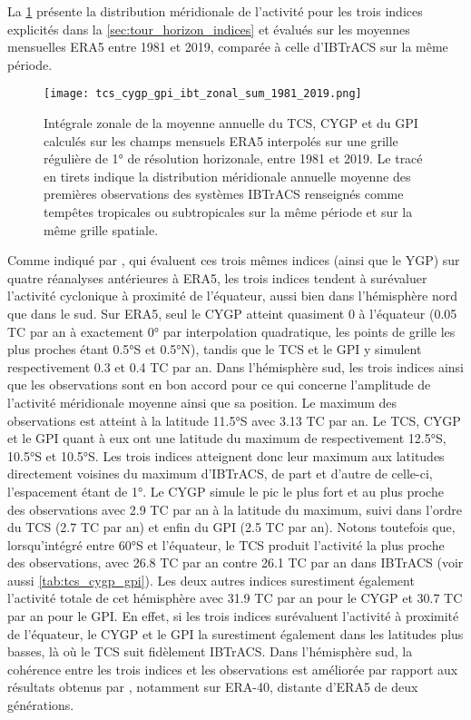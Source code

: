 \documentclass[../main.tex]{subfiles}
\begin{document}
La \cref{fig:tcs_cygp_gpi_zonal} présente la distribution méridionale de l'activité pour les trois indices explicités dans la \cref{sec:tour_horizon_indices} et
évalués sur les moyennes mensuelles ERA5 entre \num{1981} et \num{2019}, comparée à celle d'IBTrACS sur la même période. 
%
\begin{figure}[htb]
    \centering
    \texttt{[image: tcs\_cygp\_gpi\_ibt\_zonal\_sum\_1981\_2019.png]}
    \caption{Intégrale zonale de la moyenne annuelle du TCS, CYGP et du GPI calculés sur les champs mensuels ERA5 interpolés sur une grille régulière de 1° de
    résolution horizonale, entre 1981 et 2019. Le tracé en tirets indique la distribution méridionale annuelle moyenne des premières observations des systèmes
    IBTrACS renseignés comme tempêtes tropicales ou subtropicales sur la même période et sur la même grille spatiale.}
    \label{fig:tcs_cygp_gpi_zonal}
\end{figure}
%
Comme indiqué par \textcite{menkes_comparison_2012}, qui évaluent ces trois mêmes indices (ainsi que le YGP) sur quatre réanalyses antérieures à ERA5, les trois
indices tendent à surévaluer l'activité cyclonique à proximité de l'équateur, aussi bien dans l'hémisphère nord que dans le sud. Sur ERA5, seul le CYGP atteint
quasiment 0 à l'équateur (\num{0.05} TC par an à exactement 0° par interpolation quadratique, les points de grille les plus proches étant \ang{0.5}S et
\ang{0.5}N), tandis que le TCS et le GPI y simulent respectivement \num{0.3} et \num{0.4} TC par an. Dans l'hémisphère sud, les trois indices ainsi que les
observations sont en bon accord pour ce qui concerne l'amplitude de l'activité méridionale moyenne ainsi que sa position. Le maximum des observations est
atteint à la latitude \ang{11.5}S avec \num{3.13} TC par an. Le TCS, CYGP et le GPI quant à eux ont une latitude du maximum de respectivement \ang{12.5}S,
\ang{10.5}S et \ang{10.5}S. Les trois indices atteignent donc leur maximum aux latitudes directement voisines du maximum d'IBTrACS, de part et d'autre de
celle-ci, l'espacement étant de \ang{1}. Le CYGP simule le pic le plus fort et au plus proche des observations avec \num{2.9} TC par an à la latitude du
maximum, suivi dans l'ordre du TCS (\num{2.7} TC par an) et enfin du GPI (\num{2.5} TC par an). Notons toutefois que, lorsqu'intégré entre \ang{60}S et
l'équateur, le TCS produit l'activité la plus proche des observations, avec \num{26.8} TC par an contre \num{26.1} TC par an dans IBTrACS (voir aussi
\cref{tab:tcs_cygp_gpi}). Les deux autres indices surestiment également l'activité totale de cet hémisphère avec \num{31.9} TC par an pour le CYGP et \num{30.7}
TC par an pour le GPI. En effet, si les trois indices surévaluent l'activité à proximité de l'équateur, le CYGP et le GPI la surestiment également dans les
latitudes plus basses, là où le TCS suit fidèlement IBTrACS. Dans l'hémisphère sud, la cohérence entre les trois indices et les observations est améliorée par
rapport aux résultats obtenus par \textcite{menkes_comparison_2012}, notamment sur ERA-40, distante d'ERA5 de deux générations.
\end{document}
